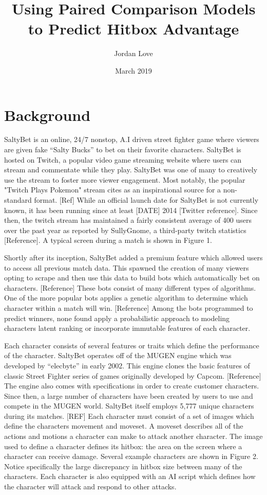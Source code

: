 \documentclass{article}
\title{Using Paired Comparison Models to Predict Hitbox Advantage}
\author{Jordan Love}
\date{March 2019}
\begin{document}
\maketitle

\section{Background}

SaltyBet is an online, 24/7 nonstop, A.I driven street fighter game where viewers are given fake ``Salty Bucks'' to bet on their favorite characters. SaltyBet is hosted on Twitch, a popular video game streaming website where users can stream and commentate while they play. SaltyBet was one of many to creatively use the stream to foster more viewer engagement. Most notably, the popular "Twitch Plays Pokemon" stream cites as an inspirational source for a non-standard format. [Ref] While an official launch date for SaltyBet is not currently known, it has been running since at least [DATE] 2014 [Twitter reference]. Since then, the twitch stream has maintained a fairly consistent average of 400 users over the past year as reported by SullyGnome, a third-party twitch statistics [Reference]. A typical screen during a match is shown in Figure 1.

Shortly after its inception, SaltyBet added a premium feature which allowed users to access all previous match data. This spawned the creation of many viewers opting to scrape and then use this data to build bots which automatically bet on characters. [Reference] These bots consist of many different types of algorithms. One of the more popular bots applies a genetic algorithm to determine which character within a match will win. [Reference] Among the bots programmed to predict winners, none found apply a probabilistic approach to modeling characters latent ranking or incorporate immutable features of each character. 

Each character consists of several features or traits which define the performance of the character. SaltyBet operates off of the MUGEN engine which was developed by ``elecbyte'' in early 2002. This engine clones the basic features of classic Street Fighter series of games originally developed by Capcom. [Reference] The engine also comes with specifications in order to create customer characters. Since then, a large number of characters have been created by users to use and compete in the MUGEN world. SaltyBet itself employs 5,777 unique characters during its matches. [REF] Each character must consist of a set of images which define the characters movement and moveset. A moveset describes all of the actions and motions a character can make to attack another character. The image used to define a character defines its hitbox: the area on the screen where a character can receive damage. Several example characters are shown in Figure 2. Notice specifically the large discrepancy in hitbox size between many of the characters. Each character is also equipped with an AI script which defines how the character will attack and respond to other attacks.
\end{document}
